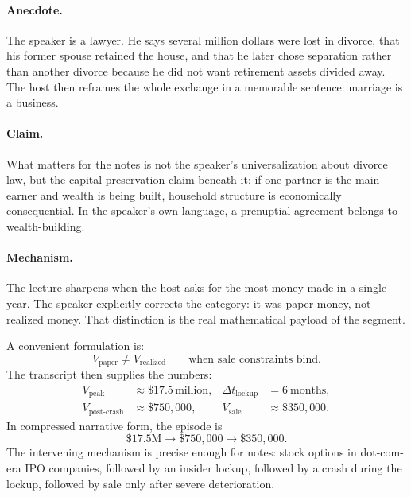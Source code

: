 \paragraph{Anecdote.}
The speaker is a lawyer. He says several million dollars were lost in divorce, that his former spouse retained the house, and that he later chose separation rather than another divorce because he did not want retirement assets divided away. The host then reframes the whole exchange in a memorable sentence: marriage is a business.

\paragraph{Claim.}
What matters for the notes is not the speaker's universalization about divorce law, but the capital-preservation claim beneath it: if one partner is the main earner and wealth is being built, household structure is economically consequential. In the speaker's own language, a prenuptial agreement belongs to wealth-building.

\paragraph{Mechanism.}
The lecture sharpens when the host asks for the most money made in a single year. The speaker explicitly corrects the category: it was paper money, not realized money. That distinction is the real mathematical payload of the segment.

A convenient formulation is:
\begin{equation}
V_{\text{paper}} \neq V_{\text{realized}}
\qquad
\text{when sale constraints bind.}
\end{equation}
The transcript then supplies the numbers:
\begin{align}
V_{\text{peak}} &\approx \$17.5\,\text{million},&
\Delta t_{\text{lockup}} &= 6\ \text{months},\\
V_{\text{post-crash}} &\approx \$750{,}000,&
V_{\text{sale}} &\approx \$350{,}000.
\end{align}
In compressed narrative form, the episode is
\begin{equation}
\$17.5\text{M} \longrightarrow \$750{,}000 \longrightarrow \$350{,}000.
\end{equation}
The intervening mechanism is precise enough for notes: stock options in dot-com-era IPO companies, followed by an insider lockup, followed by a crash during the lockup, followed by sale only after severe deterioration.


